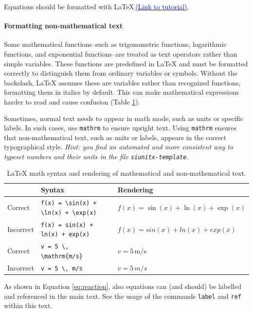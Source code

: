 \documentclass[
	german,
	accentcolor=9c,%
	type=intern,
	marginpar=false
	]{tudapub}
\begin{document}
Equations should be formatted with \LaTeX\,\href{https://www.overleaf.com/learn/latex/Learn_LaTeX_in_30_minutes#Adding_math_to_LaTeX} {\textcolor{blue}{(Link to tutorial)}}. 

\paragraph{Formatting non-mathematical text}         %
Some mathematical functions--such as trigonometric functions, logarithmic functions, and exponential functions--are treated as text operators rather than simple variables. These functions are predefined in LaTeX and must be formatted correctly to distinguish them from ordinary variables or symbols.
Without the backslash, LaTeX assumes these are variables rather than recognized functions, formatting them in italics by default. This can make mathematical expressions harder to read and cause confusion (Table \ref{tab:functions}).

Sometimes, normal text needs to appear in math mode, such as units or specific labels. In such cases, use \texttt{mathrm} to ensure upright text.
Using \texttt{mathrm} ensures that non-mathematical text, such as units or labels, appears in the correct typographical style. \emph{Hint: you find an automated and more consistent way to typeset numbers and their units in the file \texttt{siunitx-template}.}

\begin{table}[h!]
\centering
\begin{tabular}{lll}
\toprule
    &    Syntax & Rendering \\
\midrule
Correct & \verb|f(x) = \sin(x) + \ln(x) + \exp(x)| & $ f(x) = \sin(x) + \ln(x) + \exp(x) $  \\
Incorrect & \verb|f(x) = sin(x) + ln(x) + exp(x)| & $ f(x) = sin(x) + ln(x) + exp(x) $  \\
\midrule
Correct & \verb|v = 5 \, \mathrm{m/s}| & $ v = 5 \, \mathrm{m/s} $  \\
Incorrect & \verb|v = 5 \, m/s| & $ v = 5 \, m/s $  \\
\bottomrule
\end{tabular}
\caption{LaTeX math syntax and rendering of mathematical and non-mathematical text.}
\label{tab:functions}
\end{table}

As shown in Equation \eqref{eq:reaction}, also equations can (and should) be labelled and referenced in the main text. See the usage of the commands \texttt{label} and \texttt{ref} within this text.
\end{document}
